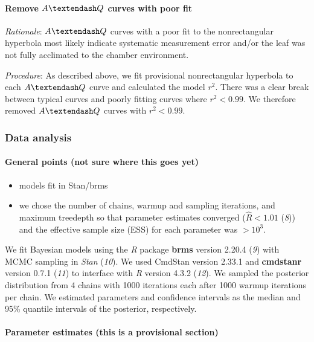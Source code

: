 \documentclass[
  letterpaper,
  DIV=11,
  numbers=noendperiod]{scrartcl}
\let\oldparagraph\paragraph
\renewcommand{\paragraph}[1]{\oldparagraph{#1}\mbox{}}
\providecommand{\tightlist}{%
  \setlength{\itemsep}{0pt}\setlength{\parskip}{0pt}}\usepackage{longtable,booktabs,array}
\newcommand{\aqcurve}{$A \textendash Q$}
\begin{document}
\paragraph{\texorpdfstring{Remove \aqcurve{} curves with poor
fit}{Remove  curves with poor fit}}\label{remove-curves-with-poor-fit}

\emph{Rationale}: \aqcurve{} curves with a poor fit to the
nonrectangular hyperbola most likely indicate systematic measurement
error and/or the leaf was not fully acclimated to the chamber
environment.

\emph{Procedure}: As described above, we fit provisional nonrectangular
hyperbola to each \aqcurve{} curve and calculated the model \(r^2\).
There was a clear break between typical curves and poorly fitting curves
where \(r^2 < 0.99\). We therefore removed \aqcurve{} curves with
\(r^2 < 0.99\).

\subsubsection{Data analysis}\label{data-analysis}

\paragraph{General points (not sure where this goes
yet)}\label{general-points-not-sure-where-this-goes-yet}

\begin{itemize}
\tightlist
\item
  models fit in Stan/brms
\item
  we chose the number of chains, warmup and sampling iterations, and
  maximum treedepth so that parameter estimates converged
  (\(\hat{R} < 1.01\) (\emph{8})) and the effective sample size (ESS)
  for each parameter was \(> 10^3\).
\end{itemize}

We fit Bayesian models using the \emph{R} package \textbf{brms} version
2.20.4 (\emph{9}) with MCMC sampling in \emph{Stan} (\emph{10}). We used
CmdStan version 2.33.1 and \textbf{cmdstanr} version 0.7.1 (\emph{11})
to interface with \emph{R} version 4.3.2 (\emph{12}). We sampled the
posterior distribution from 4 chains with 1000 iterations each after
1000 warmup iterations per chain. We estimated parameters and confidence
intervals as the median and 95\% quantile intervals of the posterior,
respectively.

\paragraph{Parameter estimates (this is a provisional
section)}\label{parameter-estimates-this-is-a-provisional-section}
\end{document}
